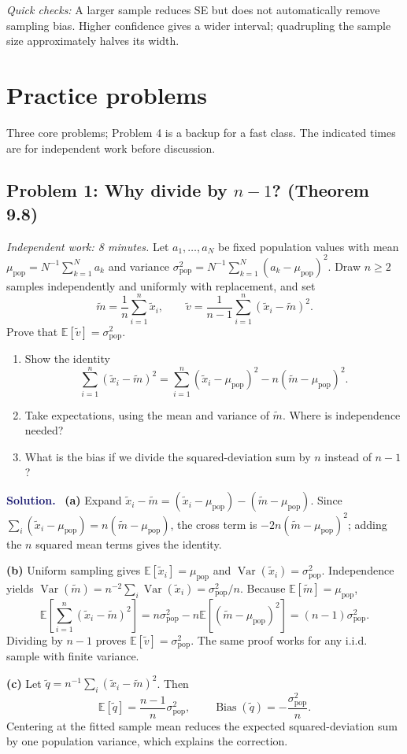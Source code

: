 \documentclass[11pt]{article}
\newcommand{\E}{\mathbb{E}}
\newcommand{\Var}{\operatorname{Var}}
\newcommand{\Bias}{\operatorname{Bias}}
\newcommand{\rv}[1]{\widetilde{#1}}
\newenvironment{answer}{%
    \par\medskip\noindent\textcolor{MidnightBlue}{\textbf{Solution.}}\ }
    {\par\medskip}
\newcommand{\workingspace}[1]{}
\newcommand{\workingspace}[1]{\vspace{#1}}
\begin{document}
\noindent\textit{Quick checks:} A larger sample reduces SE but does not
automatically remove sampling bias. Higher confidence gives a wider interval;
quadrupling the sample size approximately halves its width.

\newpage
\section*{Practice problems}
\noindent Three core problems; Problem 4 is a backup for a fast class.
The indicated times are for independent work before discussion.

\subsection*{Problem 1: Why divide by $n-1$? (Theorem 9.8)}
\noindent\textit{Independent work: 8 minutes.}
Let $a_1,\ldots,a_N$ be fixed population values with mean
$\mu_{\mathrm{pop}}=N^{-1}\sum_{k=1}^N a_k$ and variance
$\sigma_{\mathrm{pop}}^2=N^{-1}\sum_{k=1}^N(a_k-\mu_{\mathrm{pop}})^2$.
Draw $n\geq2$ samples independently and uniformly with replacement, and set
\[
  \rv{m}=\frac1n\sum_{i=1}^n\rv{x}_i,\qquad
  \rv{v}=\frac1{n-1}\sum_{i=1}^n(\rv{x}_i-\rv{m})^2.
\]
Prove that $\E[\rv{v}]=\sigma_{\mathrm{pop}}^2$.
\begin{enumerate}
  \item Show the identity
  \[
    \sum_{i=1}^n(\rv{x}_i-\rv{m})^2
    =\sum_{i=1}^n(\rv{x}_i-\mu_{\mathrm{pop}})^2
       -n(\rv{m}-\mu_{\mathrm{pop}})^2.
  \]
  \item Take expectations, using the mean and variance of $\rv{m}$.
    Where is independence needed?
  \item What is the bias if we divide the squared-deviation sum by $n$
    instead of $n-1$?
\end{enumerate}
\workingspace{7.5cm}

\begin{answer}
\textbf{(a)} Expand
$\rv{x}_i-\rv{m}=(\rv{x}_i-\mu_{\mathrm{pop}})
-(\rv{m}-\mu_{\mathrm{pop}})$. Since
$\sum_i(\rv{x}_i-\mu_{\mathrm{pop}})=n(\rv{m}-\mu_{\mathrm{pop}})$,
the cross term is $-2n(\rv{m}-\mu_{\mathrm{pop}})^2$; adding the
$n$ squared mean terms gives the identity.

\textbf{(b)} Uniform sampling gives
$\E[\rv{x}_i]=\mu_{\mathrm{pop}}$ and
$\Var(\rv{x}_i)=\sigma_{\mathrm{pop}}^2$. Independence yields
$\Var(\rv{m})=n^{-2}\sum_i\Var(\rv{x}_i)=\sigma_{\mathrm{pop}}^2/n$.
Because $\E[\rv{m}]=\mu_{\mathrm{pop}}$,
\[
  \E\!\left[\sum_{i=1}^n(\rv{x}_i-\rv{m})^2\right]
  =n\sigma_{\mathrm{pop}}^2
    -n\E[(\rv{m}-\mu_{\mathrm{pop}})^2]
  =(n-1)\sigma_{\mathrm{pop}}^2.
\]
Dividing by $n-1$ proves $\boxed{\E[\rv{v}]=\sigma_{\mathrm{pop}}^2}$.
The same proof works for any i.i.d. sample with finite variance.

\textbf{(c)} Let $\rv{q}=n^{-1}\sum_i(\rv{x}_i-\rv{m})^2$.
Then
\[
  \E[\rv{q}]=\frac{n-1}{n}\sigma_{\mathrm{pop}}^2,\qquad
  \boxed{\Bias(\rv{q})=-\frac{\sigma_{\mathrm{pop}}^2}{n}.}
\]
Centering at the fitted sample mean reduces the expected squared-deviation
sum by one population variance, which explains the correction.
\end{answer}
\end{document}
